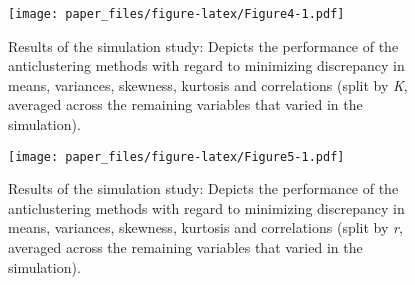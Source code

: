 \documentclass[
  man,floatsintext]{apa7}
\begin{document}
\begin{figure}
\centering
\texttt{[image: paper\_files/figure-latex/Figure4-1.pdf]}
\caption{\label{fig:Figure4}Results of the simulation study: Depicts the performance of the anticlustering methods with regard to minimizing discrepancy in means, variances, skewness, kurtosis and correlations (split by \emph{K}, averaged across the remaining variables that varied in the simulation).}
\end{figure}

\begin{figure}
\centering
\texttt{[image: paper\_files/figure-latex/Figure5-1.pdf]}
\caption{\label{fig:Figure5}Results of the simulation study: Depicts the performance of the anticlustering methods with regard to minimizing discrepancy in means, variances, skewness, kurtosis and correlations (split by \emph{r}, averaged across the remaining variables that varied in the simulation).}
\end{figure}
\end{document}
